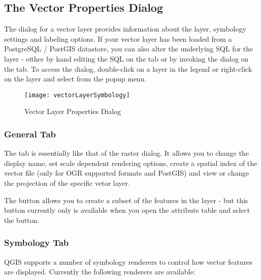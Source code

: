 \subsection{The Vector Properties Dialog}\label{sec:vectorprops}

The  dialog for a vector layer 
provides information about the layer, symbology
settings and labeling options. If your vector layer has been loaded from a
PostgreSQL / PostGIS datastore, you can also alter the underlying SQL for the
layer - either by hand editing the SQL on the  tab or by
invoking the  dialog on the  tab. 
To access the
 dialog, double-click on a layer in the legend or right-click on the
layer and select  from the popup menu.

\begin{figure}[H]
   \begin{center}
   \caption{Vector Layer Properties Dialog \nixcaption}\label{fig:vector_symbology}\smallskip
   \texttt{[image: vectorLayerSymbology]} 
\end{center}  
\end{figure}

\subsubsection{General Tab}
The  tab is essentially like that of the raster dialog. It allows you
to change the display name, set scale dependent rendering options, create a spatial 
index of the vector file (only for OGR supported formats and PostGIS) and view or
change the projection of the specific vetor layer.

The  button allows you to create a subset of the features 
in the layer - but this button currently only is available when you open the 
attribute table and select the  button.

\subsubsection{Symbology Tab}\label{sec:symbology}

QGIS supports a number of symbology renderers to control how
vector features are displayed. Currently the following renderers
are available:

